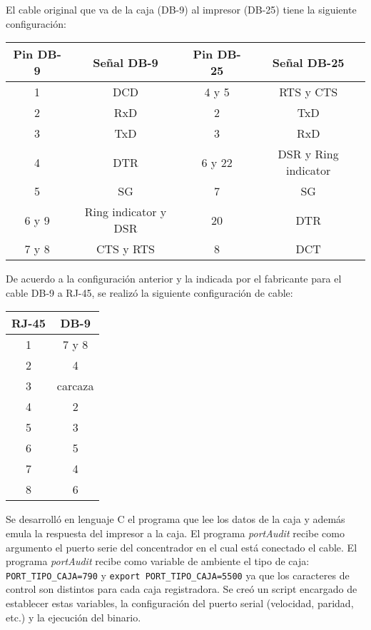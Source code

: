 El cable original que va de la caja (DB-9) al impresor (DB-25) tiene la siguiente configuración:

\begin{center}
  \begin{tabular}{|c|c|c|c|}
   \hline
   Pin DB-9 & Señal DB-9 & Pin DB-25 & Señal DB-25 \\
   \hline
   1 &  DCD & 4 y 5 & RTS y CTS \\
   \hline
   2 & RxD & 2 & TxD \\
   \hline
   3 & TxD & 3 & RxD \\
   \hline
   4 & DTR & 6 y 22 & DSR y Ring indicator \\
   \hline
   5 & SG & 7 & SG \\
   \hline
   6 y 9 & Ring indicator y DSR & 20 & DTR \\
   \hline
   7 y 8 & CTS y RTS & 8 & DCT \\
   \hline
  \end{tabular}
\end{center}

De acuerdo a la configuración anterior y la indicada por el fabricante para el cable DB-9 a RJ-45, se realizó la siguiente configuración de cable:

\begin{center}
 \begin{tabular}{|c|c|}
  \hline
  RJ-45 & DB-9 \\
  \hline
  1 & 7 y 8 \\
  \hline
  2 & 4 \\
  \hline
  3 & carcaza \\
  \hline
  4 & 2 \\
  \hline
  5 & 3 \\
  \hline
  6 & 5 \\
  \hline
  7 & 4 \\
  \hline
  8 & 6 \\
  \hline
 \end{tabular}
\end{center}

Se desarrolló en lenguaje C el programa que lee los datos de la caja y además emula la respuesta del impresor a la caja. El programa \textit{portAudit} recibe como argumento el puerto serie del concentrador en el cual está conectado el cable. El programa \textit{portAudit} recibe como variable de ambiente el tipo de caja: \texttt{PORT\_TIPO\_CAJA=790} y \texttt{export PORT\_TIPO\_CAJA=5500} ya que los caracteres de control son distintos para cada caja registradora. Se creó un script encargado de establecer estas variables, la configuración del puerto serial (velocidad, paridad, etc.) y la ejecución del binario.

